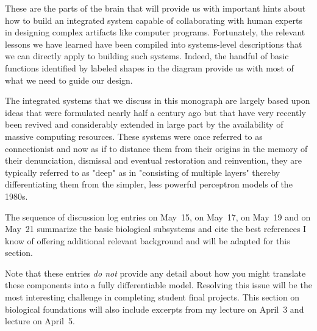 These are the parts of the brain that will provide us with important hints about how to build an integrated system capable of collaborating with human experts in designing complex artifacts like computer programs. Fortunately, the relevant lessons we have learned have been compiled into systems-level descriptions that we can directly apply to building such systems. Indeed, the handful of basic functions identified by labeled shapes in the diagram provide us with most of what we need to guide our design.

The integrated systems that we discuss in this monograph are largely based upon ideas that were formulated nearly half a century ago but that have very recently been revived and considerably extended in large part by the availability of massive computing resources. These systems were once referred to as connectionist and now as if to distance them from their origins in the memory of their denunciation, dismissal and eventual restoration and reinvention, they are typically referred to as "deep" as in "consisting of multiple layers" thereby differentiating them from the simpler, less powerful perceptron models of the 1980s.


The sequence of discussion log entries \emdash{} {} on May~15, {} on May~17, {} on May~19 and {} on May~21 \emdash{} summarize the basic biological subsystems and cite the best references I know of offering additional relevant background and will be adapted for this section.

Note that these entries {\it{do not}} provide any detail about how you might translate these components into a fully differentiable model. Resolving this issue will be the most interesting challenge in completing student final projects. This section on biological foundations will also include excerpts from my {} lecture on April~3 and {} lecture on April~5.

